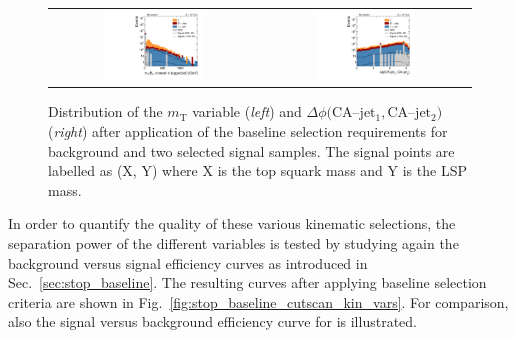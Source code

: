 \begin{figure}[!t]
  \centering
  \begin{tabular}{cc}
                \includegraphics[width=0.49\textwidth]{figures/Stop_DeltaPhiSelection_transverseMass_MET_closestAndBTaggedJet.pdf} &
                \includegraphics[width=0.49\textwidth]{figures/Stop_DeltaPhiSelection_deltaPhi_topjet1_topjet2.pdf}
  \end{tabular}
  \caption{Distribution of the $m_\mathrm{T}$ variable (\textit{left}) and $\Delta \phi(\mathrm{CA}$--$\mathrm{jet_1}, \mathrm{CA}$--$\mathrm{jet_2})$ (\textit{right}) after application of the baseline selection requirements for background and two selected signal samples. The signal points are labelled as (X, Y) where X is the top squark mass and Y is the LSP mass.}
  \label{fig:stop_baseline_kin_vars2}
\end{figure}
In order to quantify the quality of these various kinematic selections, the separation power of the different variables is tested by studying again the background versus signal efficiency curves as introduced in Sec.~\ref{sec:stop_baseline}. The resulting curves after applying baseline selection criteria are shown in Fig.~\ref{fig:stop_baseline_cutscan_kin_vars}. For comparison, also the signal versus background efficiency curve for \met is illustrated. 
